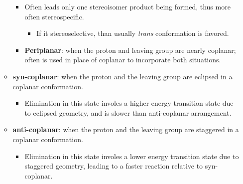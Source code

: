 \documentclass[12pt,a4paper]{article}
\begin{document}
\begin{itemize}
\begin{itemize}
            \begin{itemize}
                \item Often leads only one stereoisomer product being formed, thus more often stereospecific.
                    \begin{itemize}
                        \item If it stereoselective, than usually \textit{trans} conformation is favored.
                    \end{itemize}
                \item \textbf{Periplanar}: when the proton and leaving group are {\color{o-Sun}nearly} coplanar; often is used in place of coplanar to incorporate both situations.
            \end{itemize}
        \item \textbf{syn-coplanar}: when the proton and the leaving group are {\color{o-Sun} eclipsed} in a coplanar conformation.
            \begin{itemize}
                \item Elimination in this state involes a higher energy transition state due to eclipsed geometry, and is {\color{o-Sun}slower} than anti-coplanar arrangement.
            \end{itemize}
        \item \textbf{anti-coplanar}: when the proton and the leaving group are {\color{o-Sun}staggered} in a coplanar conformation.
            \begin{itemize}
                \item Elimination in this state involes a lower energy transition state due to staggered geometry, leading to a {\color{o-Sun}faster} reaction relative to syn-coplanar.
            \end{itemize}
    \end{itemize}
\end{itemize}
\end{document}
